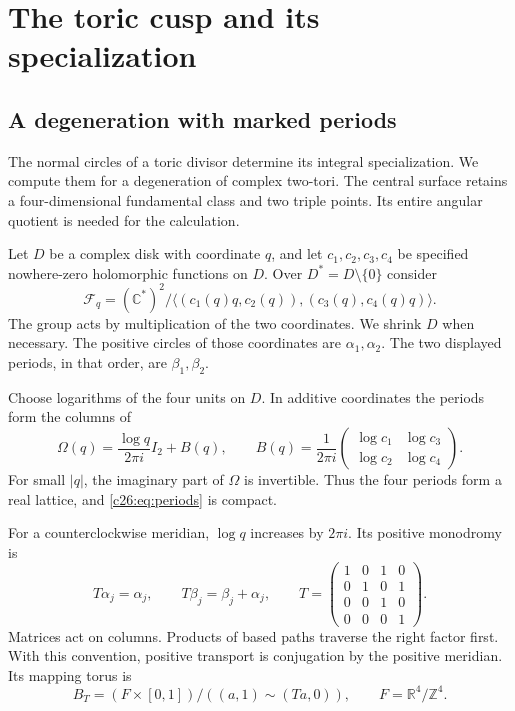 \section{The toric cusp and its specialization}\label{sec:toric-cusp}

\subsection{A degeneration with marked periods}

The normal circles of a toric divisor determine its integral specialization.
We compute them for a degeneration of complex two-tori.
The central surface retains a four-dimensional fundamental class and two
triple points. Its entire angular quotient is needed for the calculation.

Let $D$ be a complex disk with coordinate $q$, and let
$c_1,c_2,c_3,c_4$ be specified nowhere-zero holomorphic functions on $D$.
Over $D^*=D\setminus\{0\}$ consider
\begin{equation}\label{c26:eq:periods}
\mathcal F_q=(\mathbb C^*)^2/
\langle (c_1(q)q,c_2(q)),(c_3(q),c_4(q)q)\rangle.
\end{equation}
The group acts by multiplication of the two coordinates.
We shrink $D$ when necessary. The positive circles of those coordinates
are $\alpha_1,\alpha_2$. The two displayed periods, in that order, are
$\beta_1,\beta_2$.

Choose logarithms of the four units on $D$.
In additive coordinates the periods form the columns of
\[
\Omega(q)=\frac{\log q}{2\pi i}I_2+B(q),
\qquad
B(q)=\frac1{2\pi i}
\begin{pmatrix}\log c_1&\log c_3\\\log c_2&\log c_4\end{pmatrix}.
\]
For small $|q|$, the imaginary part of $\Omega$ is invertible.
Thus the four periods form a real lattice, and \eqref{c26:eq:periods} is compact.

For a counterclockwise meridian, $\log q$ increases by $2\pi i$.
Its positive monodromy is
\begin{equation}\label{c26:eq:T}
T\alpha_j=\alpha_j,\qquad T\beta_j=\beta_j+\alpha_j,
\qquad
T=\begin{pmatrix}1&0&1&0\\0&1&0&1\\0&0&1&0\\0&0&0&1\end{pmatrix}.
\end{equation}
Matrices act on columns. Products of based paths traverse the right
factor first. With this convention, positive transport is conjugation
by the positive meridian. Its mapping torus is
\begin{equation}\label{c26:eq:boundary}
B_T=(F\times[0,1])/((a,1)\sim(Ta,0)),
\qquad F=\mathbb R^4/\mathbb Z^4.
\end{equation}

